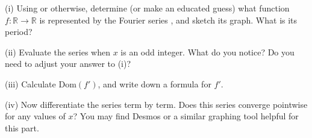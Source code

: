 \documentclass[letterpaper,10pt,english]{jupyterBook}
\begin{document}
\sphinxAtStartPar
(i) Using  or otherwise, determine (or make an educated guess) what function \(f:\mathbb{R}\to\mathbb{R}\) is represented by the Fourier series {\hyperref[\detokenize{Problems:equation-fourier}]{}}, and sketch its graph. What is its period?

\sphinxAtStartPar
(ii) Evaluate the series when \(x\) is an odd integer. What do you notice? Do you need to adjust your answer to (i)?

\sphinxAtStartPar
(iii) Calculate \(\text{Dom}(f')\), and write down a formula for \(f'\).

\sphinxAtStartPar
(iv) Now differentiate the series {\hyperref[\detokenize{Problems:equation-fourier}]{}} term by term. Does this series converge pointwise for any values of \(x\)? You may find Desmos or a similar graphing tool helpful for this part.
\end{document}
